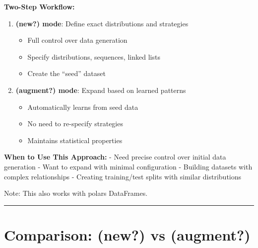 \documentclass[
  letterpaper,
]{scrbook}
\providecommand{\tightlist}{%
  \setlength{\itemsep}{0pt}\setlength{\parskip}{0pt}}
\begin{document}
\textbf{Two-Step Workflow:}

\begin{enumerate}
\def\labelenumi{\arabic{enumi}.}
\tightlist
\item
  \textbf{(\textbf{new?}) mode}: Define exact distributions and
  strategies

  \begin{itemize}
  \tightlist
  \item
    Full control over data generation
  \item
    Specify distributions, sequences, linked lists
  \item
    Create the ``seed'' dataset
  \end{itemize}
\item
  \textbf{(\textbf{augment?}) mode}: Expand based on learned patterns

  \begin{itemize}
  \tightlist
  \item
    Automatically learns from seed data
  \item
    No need to re-specify strategies
  \item
    Maintains statistical properties
  \end{itemize}
\end{enumerate}

\textbf{When to Use This Approach:} - Need precise control over initial
data generation - Want to expand with minimal configuration - Building
datasets with complex relationships - Creating training/test splits with
similar distributions

Note: This also works with polars DataFrames.

\begin{center}\rule{0.5\linewidth}{0.5pt}\end{center}

\section{\texorpdfstring{Comparison: (\textbf{new?}) vs
(\textbf{augment?})}{Comparison: (new?) vs (augment?)}}\label{comparison-new-vs-augment}
\end{document}
